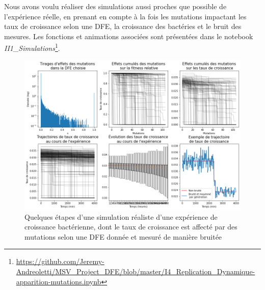 \documentclass[12pt]{article}
\begin{document}
Nous avons voulu réaliser des simulations aussi proches que possible de l'expérience réelle, en prenant en compte à la fois les mutations impactant les taux de croissance selon une DFE, la croissance des bactéries et le bruit des mesures. Les fonctions et animations associées sont présentées dans le notebook \emph{II1\_Simulations}\footnote{\url{https://github.com/Jeremy-Andreoletti/MSV_Project_DFE/blob/master/I4_Replication_Dynamique-apparition-mutations.ipynb}}.

\begin{figure}[!h]
  \begin{center}
    \vspace{3mm}
    \includegraphics[scale=0.5]{../Img/Simulations.png}
  \end{center} 
  \caption{\label{fig:simulations}Quelques étapes d'une simulation réaliste d'une expérience de croissance bactérienne, dont le taux de croissance est affecté par des mutations selon une DFE donnée et mesuré de manière bruitée}
\end{figure}
\end{document}

